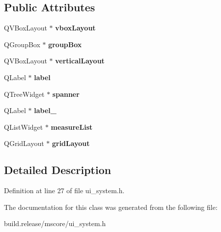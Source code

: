 \subsection*{Public Attributes}
\begin{DoxyCompactItemize}
\item 
\mbox{\label{class_ui___system_base_ae958ad73cbbca90e1b636f9b78a9ed05}} 
Q\+V\+Box\+Layout $\ast$ {\bfseries vbox\+Layout}
\item 
\mbox{\label{class_ui___system_base_a0cfb150dd8e3fb41b330c2187b3b61d0}} 
Q\+Group\+Box $\ast$ {\bfseries group\+Box}
\item 
\mbox{\label{class_ui___system_base_aee3af270236192fea9e5dc25386a6eb0}} 
Q\+V\+Box\+Layout $\ast$ {\bfseries vertical\+Layout}
\item 
\mbox{\label{class_ui___system_base_a8d4f0bdf2814079867d2529e83667585}} 
Q\+Label $\ast$ {\bfseries label}
\item 
\mbox{\label{class_ui___system_base_a7f4af4f895da354d25c294efbff48d3b}} 
Q\+Tree\+Widget $\ast$ {\bfseries spanner}
\item 
\mbox{\label{class_ui___system_base_adb60610391e12a943b87bd0ddeae595e}} 
Q\+Label $\ast$ {\bfseries label\+\_}
\item 
\mbox{\label{class_ui___system_base_a906d16fc8e5ddec265b9b0e70da07a6d}} 
Q\+List\+Widget $\ast$ {\bfseries measure\+List}
\item 
\mbox{\label{class_ui___system_base_a6f082352754eefba84a28b9fa0b1e2c5}} 
Q\+Grid\+Layout $\ast$ {\bfseries grid\+Layout}
\end{DoxyCompactItemize}


\subsection{Detailed Description}


Definition at line 27 of file ui\+\_\+system.\+h.



The documentation for this class was generated from the following file\+:\begin{DoxyCompactItemize}
\item 
build.\+release/mscore/ui\+\_\+system.\+h\end{DoxyCompactItemize}
